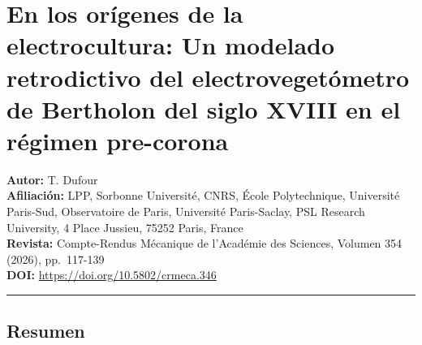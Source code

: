 \documentclass[
]{article}
\author{}
\date{}
\begin{document}
\section{En los orígenes de la electrocultura: Un modelado retrodictivo
del electrovegetómetro de Bertholon del siglo XVIII en el régimen
pre-corona}\label{en-los-oruxedgenes-de-la-electrocultura-un-modelado-retrodictivo-del-electrovegetuxf3metro-de-bertholon-del-siglo-xviii-en-el-ruxe9gimen-pre-corona}

\textbf{Autor:} T. Dufour\\
\textbf{Afiliación:} LPP, Sorbonne Université, CNRS, École
Polytechnique, Université Paris-Sud, Observatoire de Paris, Université
Paris-Saclay, PSL Research University, 4 Place Jussieu, 75252 Paris,
France\\
\textbf{Revista:} Compte-Rendus Mécanique de l'Académie des Sciences,
Volumen 354 (2026), pp.~117-139\\
\textbf{DOI:} \url{https://doi.org/10.5802/crmeca.346}

\begin{center}\rule{0.5\linewidth}{0.5pt}\end{center}

\subsection{Resumen}\label{resumen}
\end{document}
